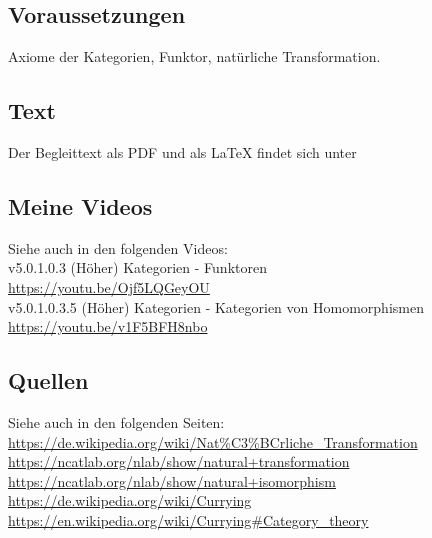 \documentclass[a4paper]{amsart}
\theoremstyle{definition}
\begin{document}
\subsection*{Voraussetzungen}
Axiome der Kategorien, Funktor, natürliche Transformation.

\subsection*{Text}
Der Begleittext als PDF und als LaTeX findet sich unter
{\tiny
   \url{}
}

\subsection*{Meine Videos}
Siehe auch in den folgenden Videos:\\
v5.0.1.0.3 (Höher) Kategorien - Funktoren\\
\url{https://youtu.be/Ojf5LQGeyOU}\\
v5.0.1.0.3.5 (Höher) Kategorien - Kategorien von Homomorphismen\\
\url{https://youtu.be/v1F5BFH8nbo}\\


\subsection*{Quellen}
Siehe auch in den folgenden Seiten:\\
\url{https://de.wikipedia.org/wiki/Nat%C3%BCrliche_Transformation}\\
\url{https://ncatlab.org/nlab/show/natural+transformation}\\
\url{https://ncatlab.org/nlab/show/natural+isomorphism}\\
\url{https://de.wikipedia.org/wiki/Currying}\\
\url{https://en.wikipedia.org/wiki/Currying#Category_theory}\\
\url{}\\
\url{}\\
\url{}\\
\url{}\\
\end{document}
